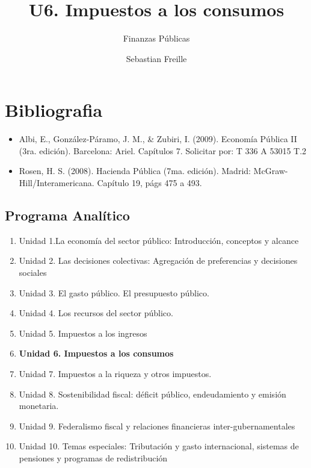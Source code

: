 \documentclass[
  letterpaper,
  DIV=11,
  numbers=noendperiod]{scrartcl}
\title{U6. Impuestos a los consumos}
\subtitle{Finanzas Públicas}
\author{Sebastian Freille}
\date{}
\providecommand{\tightlist}{%
  \setlength{\itemsep}{0pt}\setlength{\parskip}{0pt}}\usepackage{longtable,booktabs,array}
\begin{document}
\maketitle


\section{\texorpdfstring{\textbf{Bibliografia}}{Bibliografia}}\label{bibliografia}

\begin{itemize}
\tightlist
\item
  Albi, E., González-Páramo, J. M., \& Zubiri, I. (2009). Economía
  Pública II (3ra. edición). Barcelona: Ariel. Capítulos 7. Solicitar
  por: T 336 A 53015 T.2
\item
  Rosen, H. S. (2008). Hacienda Pública (7ma. edición). Madrid:
  McGraw-Hill/Interamericana. Capítulo 19, págs 475 a 493.
\end{itemize}

\subsection{Programa Analítico}\label{programa-analuxedtico}

\begin{enumerate}
\def\labelenumi{\arabic{enumi}.}
\item
  Unidad 1.La economía del sector público: Introducción, conceptos y
  alcance
\item
  Unidad 2. Las decisiones colectivas: Agregación de preferencias y
  decisiones sociales
\item
  Unidad 3. El gasto público. El presupuesto público.
\item
  Unidad 4. Los recursos del sector público.
\item
  Unidad 5. Impuestos a los ingresos
\item
  \textbf{Unidad 6. Impuestos a los consumos}
\item
  Unidad 7. Impuestos a la riqueza y otros impuestos.
\item
  Unidad 8. Sostenibilidad fiscal: déficit público, endeudamiento y
  emisión monetaria.
\item
  Unidad 9. Federalismo fiscal y relaciones financieras
  inter-gubernamentales
\item
  Unidad 10. Temas especiales: Tributación y gasto internacional,
  sistemas de pensiones y programas de redistribución
\end{enumerate}
\end{document}
